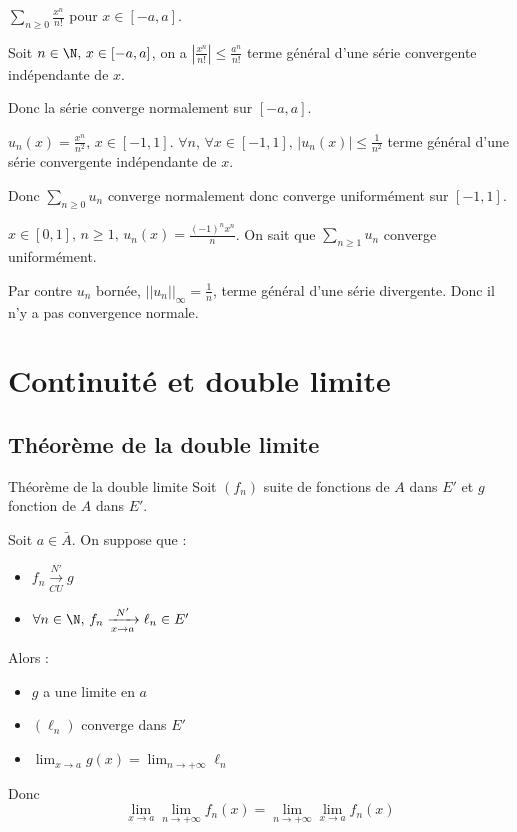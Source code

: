 \begin{exemple}
    $\displaystyle \sum_{n \geqslant 0 } \frac{x^n }{n!}$ pour $x \in [-a, a]$. 

    Soit $n \in \N, \, x \in [-a, a]$, on a $\left| \frac{x^n }{n !} \right| \leqslant \frac{a^n }{n!}$ 
    terme général d'une série convergente indépendante de $x$.

    Donc la série converge normalement sur $[-a, a]$.

    \lvspace $u_n(x) = \frac{x^n }{n^2}, \, x \in [-1, 1]$. $\forall n, \, \forall x \in [-1, 1], \, |u_n(x)| \leqslant \frac{1 }{n^2}$
    terme général d'une série convergente indépendante de $x$.

    Donc $\displaystyle \sum_{n \geqslant 0} u_n$ converge normalement donc converge uniformément sur $[-1, 1]$.

    \lvspace $\displaystyle x \in [0, 1], \, n \geqslant 1, \, u_n(x) = \frac{(-1)^n x^n} n$. On sait que 
    $\displaystyle \sum_{n \geqslant 1} u_n$ converge uniformément. 

    Par contre  $u_n$ bornée, $||u_n||_{\infty} = \frac 1 n$, terme général d'une série divergente. Donc il 
    n'y a pas convergence normale.
\end{exemple}


\section{Continuité et double limite}
\subsection{Théorème de la double limite} 

\begin{theoreme}{Théorème de la double limite}{}
    Soit $(f_n)$ suite de fonctions de $A$ dans $E'$ et $g$ fonction de $A$ dans $E'$.

    Soit $a \in \bar A$. On suppose que : 
    \begin{itemize}
        \item $f_n \xrightarrow[CU]{N'} g$ 
        \item $\forall n \in \N, \, f_n \xrightarrow[x \to a]{N'} \ell_n \in E'$
    \end{itemize}

    Alors : 
    \begin{itemize}
        \item $g$ a une limite en $a$
        \item $(\ell_n)$ converge dans $E'$
        \item $\displaystyle \lim_{x \to a} g(x) = \lim_{n \to +\infty} \ell_n$
    \end{itemize}

    Donc \[\lim_{x \to a} \lim_{n \to +\infty} f_n(x) = \lim_{n \to +\infty} \lim_{x \to a} f_n(x)\]
\end{theoreme}

